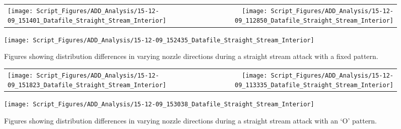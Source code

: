 \documentclass{article}
\begin{document}
\clearpage


\begin{figure}[ht]
\begin{tabular*}{\textwidth}{lr}
\texttt{[image: Script\_Figures/ADD\_Analysis/15-12-09\_151401\_Datafile\_Straight\_Stream\_Interior]} &
\texttt{[image: Script\_Figures/ADD\_Analysis/15-12-09\_112850\_Datafile\_Straight\_Stream\_Interior]} \\
\end{tabular*}
\centering
\texttt{[image: Script\_Figures/ADD\_Analysis/15-12-09\_152435\_Datafile\_Straight\_Stream\_Interior]}
\caption{Figures showing distribution differences in varying nozzle directions during a straight stream attack with a fixed pattern.}
\label{fig:Interior_Varying_Nozzle_Direction_SS_Fixed_Pattern}
\end{figure}

\clearpage


\begin{figure}[ht]
\begin{tabular*}{\textwidth}{lr}
\texttt{[image: Script\_Figures/ADD\_Analysis/15-12-09\_151823\_Datafile\_Straight\_Stream\_Interior]} &
\texttt{[image: Script\_Figures/ADD\_Analysis/15-12-09\_113335\_Datafile\_Straight\_Stream\_Interior]} \\
\end{tabular*}
\centering
\texttt{[image: Script\_Figures/ADD\_Analysis/15-12-09\_153038\_Datafile\_Straight\_Stream\_Interior]}
\caption{Figures showing distribution differences in varying nozzle directions during a straight stream attack with an `O' pattern.}
\label{fig:Interior_Varying_Nozzle_Direction_SS_O_Pattern}
\end{figure}

\clearpage

\end{document}
